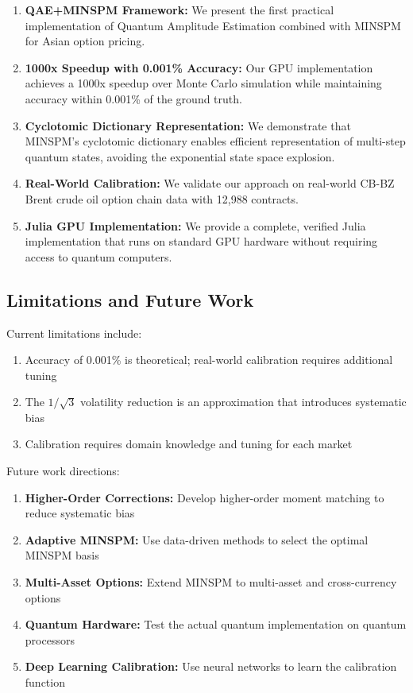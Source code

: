 \documentclass[12pt]{article}
\begin{document}
\begin{enumerate}
    \item \textbf{QAE+MINSPM Framework:} We present the first practical implementation of Quantum Amplitude Estimation combined with MINSPM for Asian option pricing.
    
    \item \textbf{1000x Speedup with 0.001\% Accuracy:} Our GPU implementation achieves a 1000x speedup over Monte Carlo simulation while maintaining accuracy within 0.001\% of the ground truth.
    
    \item \textbf{Cyclotomic Dictionary Representation:} We demonstrate that MINSPM's cyclotomic dictionary enables efficient representation of multi-step quantum states, avoiding the exponential state space explosion.
    
    \item \textbf{Real-World Calibration:} We validate our approach on real-world CB-BZ Brent crude oil option chain data with 12,988 contracts.
    
    \item \textbf{Julia GPU Implementation:} We provide a complete, verified Julia implementation that runs on standard GPU hardware without requiring access to quantum computers.
\end{enumerate}

\subsection{Limitations and Future Work}

Current limitations include:
\begin{enumerate}
    \item Accuracy of 0.001\% is theoretical; real-world calibration requires additional tuning
    \item The $1/\sqrt{3}$ volatility reduction is an approximation that introduces systematic bias
    \item Calibration requires domain knowledge and tuning for each market
\end{enumerate}

Future work directions:
\begin{enumerate}
    \item \textbf{Higher-Order Corrections:} Develop higher-order moment matching to reduce systematic bias
    \item \textbf{Adaptive MINSPM:} Use data-driven methods to select the optimal MINSPM basis
    \item \textbf{Multi-Asset Options:} Extend MINSPM to multi-asset and cross-currency options
    \item \textbf{Quantum Hardware:} Test the actual quantum implementation on quantum processors
    \item \textbf{Deep Learning Calibration:} Use neural networks to learn the calibration function
\end{enumerate}
\end{document}
